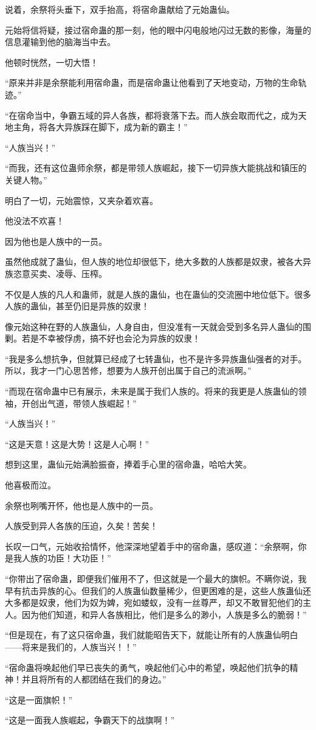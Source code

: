 \begin{this_body}
说着，余祭将头垂下，双手抬高，将宿命蛊献给了元始蛊仙。

元始将信将疑，接过宿命蛊的那一刻，他的眼中闪电般地闪过无数的影像，海量的信息灌输到他的脑海当中去。

他顿时恍然，一切大悟！

“原来并非是余祭能利用宿命蛊，而是宿命蛊让他看到了天地变动，万物的生命轨迹。”

“在宿命当中，争霸五域的异人各族，都将衰落下去。而人族会取而代之，成为天地主角，将各大异族踩在脚下，成为新的霸主！”

“人族当兴！”

“而我，还有这位蛊师余祭，都是带领人族崛起，接下一切异族大能挑战和镇压的关键人物。”

明白了一切，元始震惊，又夹杂着欢喜。

他没法不欢喜！

因为他也是人族中的一员。

虽然他成就了蛊仙，但人族的地位却很低下，绝大多数的人族都是奴隶，被各大异族恣意买卖、凌辱、压榨。

不仅是人族的凡人和蛊师，就是人族的蛊仙，也在蛊仙的交流圈中地位低下。很多人族的蛊仙，甚至仍旧是异族的奴隶！

像元始这种在野的人族蛊仙，人身自由，但没准有一天就会受到多名异人蛊仙的围剿。若是不幸被俘虏，搞不好也会沦为异族的奴隶！

“我是多么想抗争，但就算已经成了七转蛊仙，也不是许多异族蛊仙强者的对手。所以，我才一门心思苦修，想要为人族开创出属于自己的流派啊。”

“而现在宿命蛊中已有展示，未来是属于我们人族的。将来的我更是人族蛊仙的领袖，开创出气道，带领人族崛起！”

“人族当兴！”

“这是天意！这是大势！这是人心啊！”

想到这里，蛊仙元始满脸振奋，捧着手心里的宿命蛊，哈哈大笑。

他喜极而泣。

余祭也咧嘴开怀，他也是人族中的一员。

人族受到异人各族的压迫，久矣！苦矣！

长叹一口气，元始收拾情怀，他深深地望着手中的宿命蛊，感叹道：“余祭啊，你是我人族的功臣！大功臣！”

“你带出了宿命蛊，即便我们催用不了，但这就是一个最大的旗帜。不瞒你说，我早有抗击异族的心。但我们的人族蛊仙数量稀少，但更困难的是，这些人族蛊仙还大多都是奴隶，他们为奴为婢，宛如蝼蚁，没有一丝尊严，却又不敢冒犯他们的主人。因为他们知道，和异人各族相比，他们是多么的渺小，人族是多么的脆弱！”

“但是现在，有了这只宿命蛊，我们就能昭告天下，就能让所有的人族蛊仙明白——将来是我们的，人族当兴！！”

“宿命蛊将唤起他们早已丧失的勇气，唤起他们心中的希望，唤起他们抗争的精神！并且将所有的人都团结在我们的身边。”

“这是一面旗帜！”

“这是一面我人族崛起，争霸天下的战旗啊！”

\end{this_body}

